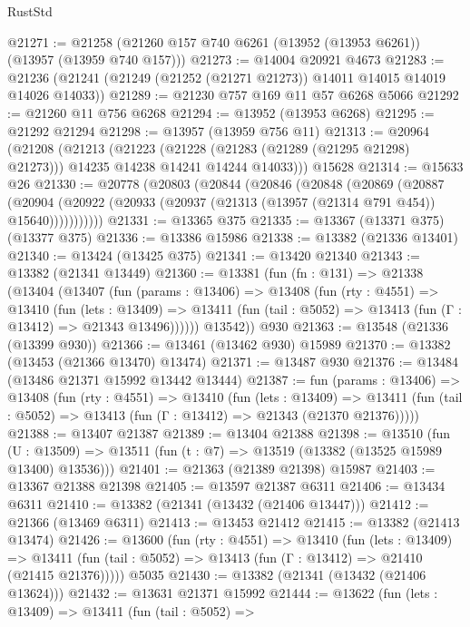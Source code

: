 \begin{lexlean}{RustStd}
\begin{coremodule}
@21271 := @21258 (@21260 @157 @740 @6261 (@13952 (@13953 @6261)) (@13957 (@13959 @740 @157)))
@21273 := @14004 @20921 @4673
@21283 := @21236 (@21241 (@21249 (@21252 (@21271 @21273)) @14011 @14015 @14019 @14026 @14033))
@21289 := @21230 @757 @169 @11 @57 @6268 @5066
@21292 := @21260 @11 @756 @6268
@21294 := @13952 (@13953 @6268)
@21295 := @21292 @21294
@21298 := @13957 (@13959 @756 @11)
@21313 := @20964
    (@21208
      (@21213
        (@21223
          (@21228 (@21283 (@21289 (@21295 @21298) @21273)))
          @14235
          @14238
          @14241
          @14244
          @14033)))
    @15628
@21314 := @15633 @26
@21330 := @20778
    (@20803
      (@20844
        (@20846
          (@20848
            (@20869
              (@20887
                (@20904
                  (@20922 (@20933 (@20937 (@21313 (@13957 (@21314 @791 @454)) @15640)))))))))))
@21331 := @13365 @375
@21335 := @13367 (@13371 @375) (@13377 @375)
@21336 := @13386 @15986
@21338 := @13382 (@21336 @13401)
@21340 := @13424 (@13425 @375)
@21341 := @13420 @21340
@21343 := @13382 (@21341 @13449)
@21360 := @13381
    (fun (fn : @131) =>
    @21338
      (@13404
        (@13407
          (fun (params : @13406) =>
          @13408
            (fun (rty : @4551) =>
            @13410
              (fun (lets : @13409) =>
              @13411 (fun (tail : @5052) => @13413 (fun (Γ : @13412) => @21343 @13496))))))
        @13542))
    @930
@21363 := @13548 (@21336 (@13399 @930))
@21366 := @13461 (@13462 @930) @15989
@21370 := @13382 (@13453 (@21366 @13470) @13474)
@21371 := @13487 @930
@21376 := @13484 (@13486 @21371 @15992 @13442 @13444)
@21387 := fun (params : @13406) =>
  @13408
    (fun (rty : @4551) =>
    @13410
      (fun (lets : @13409) =>
      @13411 (fun (tail : @5052) => @13413 (fun (Γ : @13412) => @21343 (@21370 @21376)))))
@21388 := @13407 @21387
@21389 := @13404 @21388
@21398 := @13510
    (fun (U : @13509) => @13511 (fun (t : @7) => @13519 (@13382 (@13525 @15989 @13400) @13536)))
@21401 := @21363 (@21389 @21398) @15987
@21403 := @13367 @21388 @21398
@21405 := @13597 @21387 @6311
@21406 := @13434 @6311
@21410 := @13382 (@21341 (@13432 (@21406 @13447)))
@21412 := @21366 (@13469 @6311)
@21413 := @13453 @21412
@21415 := @13382 (@21413 @13474)
@21426 := @13600
    (fun (rty : @4551) =>
    @13410
      (fun (lets : @13409) =>
      @13411 (fun (tail : @5052) => @13413 (fun (Γ : @13412) => @21410 (@21415 @21376)))))
    @5035
@21430 := @13382 (@21341 (@13432 (@21406 @13624)))
@21432 := @13631 @21371 @15992
@21444 := @13622
    (fun (lets : @13409) =>
    @13411
      (fun (tail : @5052) =>

\end{coremodule}
\end{lexlean}
